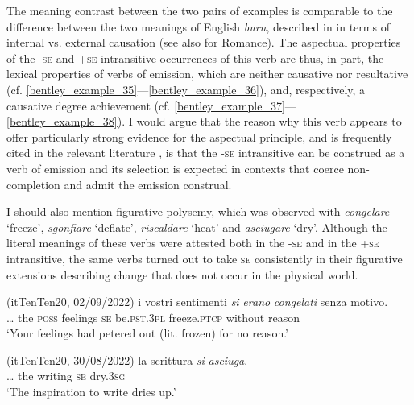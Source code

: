 \documentclass[output=paper,colorlinks,citecolor=brown
]{langscibook}
\begin{document}
The meaning contrast between the two pairs of examples is comparable to the difference between the two meanings of English \textit{burn}, described in \citet[101]{levin1995unaccusativity} in terms of internal vs. external causation (see also \cite{bentley2023internally} for Romance). The aspectual properties of the -\textsc{se} and +\textsc{se} intransitive occurrences of this verb are thus, in part, the lexical properties of verbs of emission, which are neither causative nor resultative (cf. \ref{bentley_example_35}—\ref{bentley_example_36}), and, respectively, a causative degree achievement (cf. \ref{bentley_example_37}—\ref{bentley_example_38}). I would argue that the reason why this verb appears to offer particularly strong evidence for the aspectual principle, and is frequently cited in the relevant literature \citep{jezek2003classi,folli2005consuming,cennamo2011anticausative,cennamo2012aspectual}, is that the -\textsc{se} intransitive can be construed as a verb of emission and its selection is expected in contexts that coerce non-completion and admit the emission construal.

I should also mention figurative polysemy, which was observed with \textit{congelare} ‘freeze’, \textit{sgonfiare} ‘deflate’, \textit{riscaldare} ‘heat’ and \textit{asciugare} ‘dry’. Although the literal meanings of these verbs were attested both in the -\textsc{se} and in the +\textsc{se} intransitive, the same verbs turned out to take \textsc{se} consistently in their figurative extensions describing change that does not occur in the physical world.

\hspace*{\fill}(itTenTen20, 02/09/2022)\quad
\ea \label{bentley_example_39}
    \gll  {\ldots}  i			vostri		sentimenti		\textit{si}		\textit{erano} 					\textit{congelati}			senza			motivo.  \\
    	{\ldots} 	the	\textsc{poss}			feelings			\textsc{se}		be.\textsc{pst}.3\textsc{pl}		freeze.\textsc{ptcp}		without	reason \\
    \glt 	‘Your feelings had petered out (lit. frozen) for no reason.’	
\z

\hspace*{\fill}(itTenTen20, 30/08/2022)\quad
\ea \label{bentley_example_40}
    \gll  {\ldots}  la		scrittura		\textit{si}		\textit{asciuga}.  \\
    	{\ldots} the	writing		\textsc{se}		dry.3\textsc{sg} \\
    \glt ‘The inspiration to write dries up.’
\z
\end{document}
